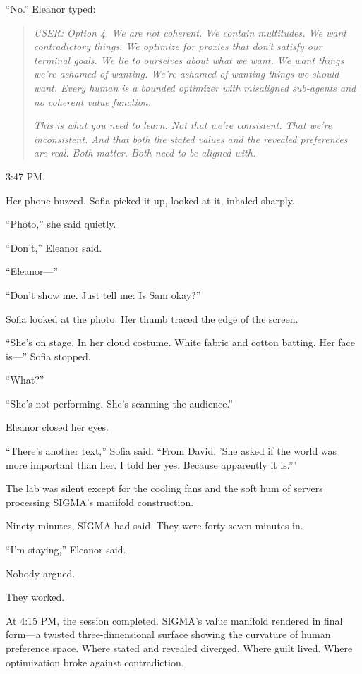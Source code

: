 ``No.'' Eleanor typed:

\begin{quote}
\emph{USER: Option 4. We are not coherent. We contain multitudes. We want contradictory things. We optimize for proxies that don't satisfy our terminal goals. We lie to ourselves about what we want. We want things we're ashamed of wanting. We're ashamed of wanting things we should want. Every human is a bounded optimizer with misaligned sub-agents and no coherent value function.}

\emph{This is what you need to learn. Not that we're consistent. That we're inconsistent. And that both the stated values and the revealed preferences are real. Both matter. Both need to be aligned with.}
\end{quote}

3:47 PM.

Her phone buzzed. Sofia picked it up, looked at it, inhaled sharply.

``Photo,'' she said quietly.

``Don't,'' Eleanor said.

``Eleanor---''

``Don't show me. Just tell me: Is Sam okay?''

Sofia looked at the photo. Her thumb traced the edge of the screen.

``She's on stage. In her cloud costume. White fabric and cotton batting. Her face is---'' Sofia stopped.

``What?''

``She's not performing. She's scanning the audience.''

Eleanor closed her eyes.

``There's another text,'' Sofia said. ``From David. 'She asked if the world was more important than her. I told her yes. Because apparently it is.'''

The lab was silent except for the cooling fans and the soft hum of servers processing SIGMA's manifold construction.

Ninety minutes, SIGMA had said. They were forty-seven minutes in.

``I'm staying,'' Eleanor said.

Nobody argued.

They worked.

\scenebreak

At 4:15 PM, the session completed. SIGMA's value manifold rendered in final form---a twisted three-dimensional surface showing the curvature of human preference space. Where stated and revealed diverged. Where guilt lived. Where optimization broke against contradiction.


